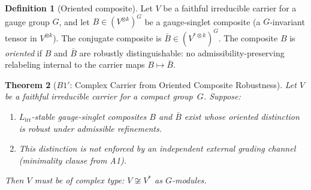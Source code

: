 \documentclass[11pt]{article}
\newtheorem{theorem}{Theorem}[section]
\theoremstyle{definition}
\newtheorem{definition}[theorem]{Definition}
\begin{document}
\begin{definition}[Oriented composite]\label{def:oriented_composite}
Let $V$ be a faithful irreducible carrier for a gauge group $G$, and
let $B \in (V^{\otimes k})^G$ be a gauge-singlet composite
(a $G$-invariant tensor in $V^{\otimes k}$).  The conjugate composite
is $\bar{B} \in (V^{*\otimes k})^G$.  The composite $B$ is
\emph{oriented} if $B$ and $\bar{B}$ are robustly distinguishable:
no admissibility-preserving relabeling internal to the carrier maps
$B \mapsto \bar{B}$.
\end{definition}

\begin{theorem}[$B1'$: Complex Carrier from Oriented Composite Robustness]\label{thm:B1prime}
Let $V$ be a faithful irreducible carrier for a compact group~$G$.
Suppose:
\begin{enumerate}[label=(B\arabic*),nosep]
  \item $L_{\mathrm{irr}}$-stable gauge-singlet composites $B$ and
        $\bar{B}$ exist whose oriented distinction is robust under
        admissible refinements.
  \item This distinction is not enforced by an independent external
        grading channel (minimality clause from A1).
\end{enumerate}
Then $V$ must be of \emph{complex type}: $V \not\cong V^*$ as $G$-modules.
\end{theorem}
\end{document}
